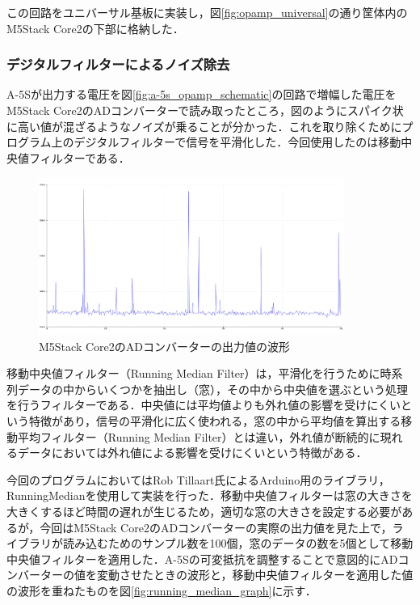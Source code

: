 この回路をユニバーサル基板に実装し，図\ref{fig:opamp_universal}の通り筐体内のM5Stack Core2の下部に格納した．

\subsubsection{デジタルフィルターによるノイズ除去}

A-5Sが出力する電圧を図\ref{fig:a-5s_opamp_schematic}の回路で増幅した電圧をM5Stack Core2のADコンバーターで読み取ったところ，図のようにスパイク状に高い値が混ざるようなノイズが乗ることが分かった．これを取り除くためにプログラム上のデジタルフィルターで信号を平滑化した．今回使用したのは移動中央値フィルターである．

\begin{figure}[H]
  \begin{center}
    \includegraphics[width=10cm]{fig/m5core2_adc_raw}
    \caption{M5Stack Core2のADコンバーターの出力値の波形}
    \label{fig:m5core2_adc_raw}
  \end{center}
\end{figure}

移動中央値フィルター（Running Median Filter）は，平滑化を行うために時系列データの中からいくつかを抽出し（窓），その中から中央値を選ぶという処理を行うフィルターである．中央値には平均値よりも外れ値の影響を受けにくいという特徴があり，信号の平滑化に広く使われる，窓の中から平均値を算出する移動平均フィルター（Running Median Filter）とは違い，外れ値が断続的に現れるデータにおいては外れ値による影響を受けにくいという特徴がある．

今回のプログラムにおいてはRob Tillaart氏によるArduino用のライブラリ，RunningMedian\cite{tillaart_2021}を使用して実装を行った．移動中央値フィルターは窓の大きさを大きくするほど時間の遅れが生じるため，適切な窓の大きさを設定する必要があるが，今回はM5Stack Core2のADコンバーターの実際の出力値を見た上で，ライブラリが読み込むためのサンプル数を100個，窓のデータの数を5個として移動中央値フィルターを適用した．A-5Sの可変抵抗を調整することで意図的にADコンバーターの値を変動させたときの波形と，移動中央値フィルターを適用した値の波形を重ねたものを図\ref{fig:running_median_graph}に示す．

